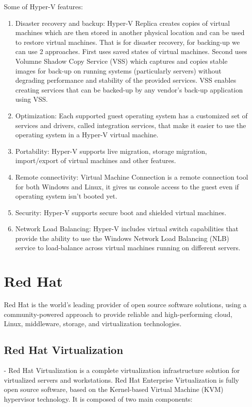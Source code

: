 \begin{enumerate}
Some of Hyper-V features:
\begin{enumerate}
\item Disaster recovery and backup: Hyper-V Replica creates copies of virtual machines which are then stored in another physical location and can be used to restore virtual machines. That is for disaster recovery, for backing-up we can use 2 approaches. First uses saved states of virtual machines. Second uses Volumne Shadow Copy Service (VSS) which captures and copies stable images for back-up on running systems (particularly servers) without degrading performance and stability of the provided services. VSS enables creating services that can be backed-up by any vendor's back-up application using VSS.
\item Optimization: Each supported guest operating system has a customized set of services and drivers, called integration services, that make it easier to use the operating system in a Hyper-V virtual machine.
\item Portability: Hyper-V supports live migration, storage migration, import/export of virtual machines and other features.
\item Remote connectivity: Virtual Machine Connection is a remote connection tool for both Windows and Linux, it gives us console access to the guest even if operating system isn't booted yet.
\item Security: Hyper-V supports secure boot and shielded virtual machines.
\item Network Load Balancing: Hyper-V includes virtual switch capabilities that provide the ability to use the Windows Network Load Balancing (NLB) service to load-balance across virtual machines running on different servers.
\end{enumerate}

\section{Red Hat}
Red Hat is the world’s leading provider of open source software solutions, using a community-powered approach to provide reliable and high-performing cloud, Linux, middleware, storage, and virtualization technologies.

\subsection{Red Hat Virtualization}-
Red Hat Virtualization is a complete virtualization infrastructure solution for virtualized servers and workstations. Red Hat Enterprise Virtualization is fully open source software, based on the Kernel-based Virtual Machine (KVM) hypervisor technology. It is  composed of two main components:


\end{enumerate}
